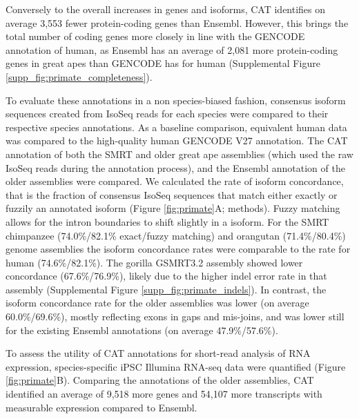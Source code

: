 \documentclass[fleqn,10pt]{wlscirep}
\begin{document}
Conversely to the overall increases in genes and isoforms, CAT identifies on average 3,553 fewer protein-coding genes than Ensembl. However, this brings the total number of coding genes more closely in line with the GENCODE annotation of human, as Ensembl has an average of 2,081 more protein-coding genes in great apes than GENCODE has for human (Supplemental Figure \ref{supp_fig:primate_completeness}). 

To evaluate these annotations in a non species-biased fashion, consensus isoform sequences created from IsoSeq reads for each species were compared to their respective species annotations. As a baseline comparison, equivalent human data was compared to the high-quality human GENCODE V27 annotation. The CAT annotation of both the SMRT and older great ape assemblies (which used the raw IsoSeq reads during the annotation process), and the Ensembl annotation of the older assemblies were compared. We calculated the rate of isoform concordance, that is the fraction of consensus IsoSeq sequences that match either exactly or fuzzily an annotated isoform (Figure \ref{fig:primate}A; methods). Fuzzy matching allows for the intron boundaries to shift slightly in a isoform. For the SMRT chimpanzee (74.0\%/82.1\% exact/fuzzy matching) and orangutan (71.4\%/80.4\%) genome assemblies the isoform concordance rates were comparable to the rate for human (74.6\%/82.1\%). The gorilla GSMRT3.2 assembly showed lower concordance (67.6\%/76.9\%), likely due to the higher indel error rate in that assembly (Supplemental Figure \ref{supp_fig:primate_indels}). In contrast, the isoform concordance rate for the older assemblies was lower (on average 60.0\%/69.6\%), mostly reflecting exons in gaps and mis-joins, and was lower still for the existing Ensembl annotations (on average 47.9\%/57.6\%).

To assess the utility of CAT annotations for short-read analysis of RNA expression, species-specific iPSC Illumina RNA-seq data were quantified (Figure \ref{fig:primate}B). Comparing the annotations of the older assemblies, CAT identified an average of 9,518 more genes and 54,107 more transcripts with measurable expression compared to Ensembl.
\end{document}
